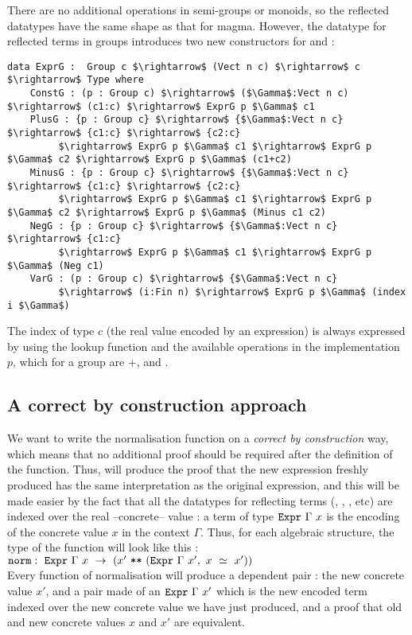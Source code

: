 There are no additional operations in semi-groups or monoids, so the reflected
datatypes have the same shape as that for magma.  However, the datatype for
reflected terms in groups introduces two new constructors for 
and :

\begin{lstlisting}
data ExprG :  Group c $\rightarrow$ (Vect n c) $\rightarrow$ c $\rightarrow$ Type where
    ConstG : (p : Group c) $\rightarrow$ ($\Gamma$:Vect n c) $\rightarrow$ (c1:c) $\rightarrow$ ExprG p $\Gamma$ c1
    PlusG : {p : Group c} $\rightarrow$ {$\Gamma$:Vect n c} $\rightarrow$ {c1:c} $\rightarrow$ {c2:c} 
         $\rightarrow$ ExprG p $\Gamma$ c1 $\rightarrow$ ExprG p $\Gamma$ c2 $\rightarrow$ ExprG p $\Gamma$ (c1+c2)
    MinusG : {p : Group c} $\rightarrow$ {$\Gamma$:Vect n c} $\rightarrow$ {c1:c} $\rightarrow$ {c2:c} 
         $\rightarrow$ ExprG p $\Gamma$ c1 $\rightarrow$ ExprG p $\Gamma$ c2 $\rightarrow$ ExprG p $\Gamma$ (Minus c1 c2)
    NegG : {p : Group c} $\rightarrow$ {$\Gamma$:Vect n c} $\rightarrow$ {c1:c} 
         $\rightarrow$ ExprG p $\Gamma$ c1 $\rightarrow$ ExprG p $\Gamma$ (Neg c1)
    VarG : (p : Group c) $\rightarrow$ {$\Gamma$:Vect n c} 
         $\rightarrow$ (i:Fin n) $\rightarrow$ ExprG p $\Gamma$ (index i $\Gamma$)
\end{lstlisting}


The index of type $c$ (the real value encoded by an expression) is always expressed by using the lookup function  and the available operations in the implementation $p$, which for a group are $+$,  and .

	\subsection{A correct by construction approach}
\label{sect:correctByConstruction}

We want to write the normalisation function on a \emph{correct by construction} way, which means that no additional proof should be required after the definition of the function. Thus,  will produce the proof that the new expression freshly produced has the same interpretation as the original expression, and this will be made easier by the fact that all the datatypes for reflecting terms (, , , etc) are indexed over the real --concrete-- value : a term of type ${\mbox{\texttt{Expr}}}\ \Gamma\ x$ is the encoding of the concrete value $x$ in the context $\Gamma$.
Thus, for each algebraic structure, the type of the function  will look like this : \\
$\code{norm} :\ \code{Expr}\ \Gamma\ x\ \rightarrow\ (x'\ \code{**}\ (\code{Expr}\ \Gamma\ x',\ x\ \simeq\ x'))$ \\
Every function of normalisation  will produce a dependent pair : the new concrete value $x'$, and a pair made of an $\code{Expr}\ \Gamma\ x'$ which is the new encoded term indexed over the new concrete value we have just produced, and a proof that old and new concrete values $x$ and $x'$ are equivalent.

